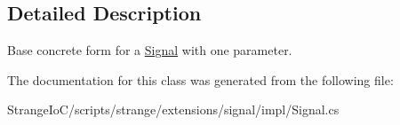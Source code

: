 \subsection{Detailed Description}
Base concrete form for a \hyperlink{classstrange_1_1extensions_1_1signal_1_1impl_1_1_signal}{Signal} with one parameter. 

The documentation for this class was generated from the following file\-:\begin{DoxyCompactItemize}
\item 
Strange\-Io\-C/scripts/strange/extensions/signal/impl/Signal.\-cs\end{DoxyCompactItemize}
